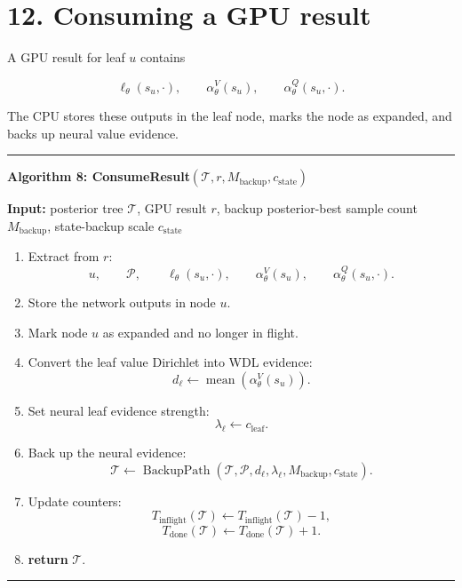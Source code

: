 \documentclass[11pt]{article}
\newcommand{\mean}{\operatorname{mean}}
\newcommand{\Tree}{\mathcal{T}}
\newcommand{\Path}{\mathcal{P}}
\newcommand{\BackupPath}{\operatorname{BackupPath}}
\newenvironment{algorithmblock}[1]
{
  \par\medskip
  \noindent\hrule\par\smallskip
  \noindent\textbf{#1}
  \par\smallskip
}
{
  \par\smallskip\noindent\hrule\par\medskip
}
\newcommand{\Input}{\textbf{Input: }}
\newcommand{\Return}{\textbf{return }}
\begin{document}
\section*{12. Consuming a GPU result}

A GPU result for leaf \(u\) contains

\[
\ell_\theta(s_u,\cdot),
\qquad
\alpha_\theta^V(s_u),
\qquad
\alpha_\theta^Q(s_u,\cdot).
\]

The CPU stores these outputs in the leaf node, marks the node as expanded, and
backs up neural value evidence.

\begin{algorithmblock}{Algorithm 8: ConsumeResult\((\Tree,r,M_{\mathrm{backup}},c_{\mathrm{state}})\)}

\Input posterior tree \(\Tree\), GPU result \(r\), backup posterior-best sample count \(M_{\mathrm{backup}}\), state-backup scale \(c_{\mathrm{state}}\)

\begin{enumerate}[leftmargin=2em]
  \item Extract from \(r\):
  \[
  u,
  \qquad
  \Path,
  \qquad
  \ell_\theta(s_u,\cdot),
  \qquad
  \alpha_\theta^V(s_u),
  \qquad
  \alpha_\theta^Q(s_u,\cdot).
  \]

  \item Store the network outputs in node \(u\).

  \item Mark node \(u\) as expanded and no longer in flight.

  \item Convert the leaf value Dirichlet into WDL evidence:
  \[
  d_\ell
  \gets
  \mean
  \left(
  \alpha_\theta^V(s_u)
  \right).
  \]

  \item Set neural leaf evidence strength:
  \[
  \lambda_\ell
  \gets
  c_{\mathrm{leaf}}.
  \]

  \item Back up the neural evidence:
  \[
  \Tree
  \gets
  \BackupPath(\Tree,\Path,d_\ell,\lambda_\ell,M_{\mathrm{backup}},c_{\mathrm{state}}).
  \]

  \item Update counters:
  \[
  T_{\mathrm{inflight}}(\Tree)
  \gets
  T_{\mathrm{inflight}}(\Tree)-1,
  \]
  \[
  T_{\mathrm{done}}(\Tree)
  \gets
  T_{\mathrm{done}}(\Tree)+1.
  \]

  \item \Return \(\Tree\).
\end{enumerate}

\end{algorithmblock}
\end{document}
